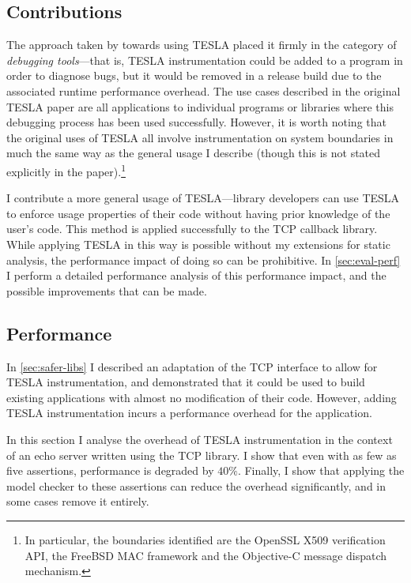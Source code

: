 \subsection{Contributions}

The approach taken by \textcite{anderson_tesla:_2014} towards using TESLA placed
it firmly in the category of \emph{debugging tools}---that is, TESLA
instrumentation could be added to a program in order to diagnose bugs, but it
would be removed in a release build due to the associated runtime performance
overhead. The use cases described in the original TESLA paper are all
applications to individual programs or libraries where this debugging process
has been used successfully. However, it is worth noting that the original uses
of TESLA all involve instrumentation on system boundaries in much the same way
as the general usage I describe (though this is not stated explicitly in the
paper).\footnote{In particular, the boundaries identified are the OpenSSL X509
verification API, the FreeBSD MAC framework and the Objective-C message dispatch
mechanism.}

I contribute a more general usage of TESLA---library developers can use TESLA to
enforce usage properties of their code without having prior knowledge of the
user's code. This method is applied successfully to the \lwip{} TCP callback
library. While applying TESLA in this way is possible without my extensions for
static analysis, the performance impact of doing so can be prohibitive. In
\autoref{sec:eval-perf} I perform a detailed performance analysis of this
performance impact, and the possible improvements that can be made.

\subsection{Performance} \label{sec:eval-perf}

In \autoref{sec:safer-libs} I described an adaptation of the \lwip{} TCP interface
to allow for TESLA instrumentation, and demonstrated that it could be used to
build existing applications with almost no modification of their code. However,
adding TESLA instrumentation incurs a performance overhead for the application.

In this section I analyse the overhead of TESLA instrumentation in the context
of an echo server written using the \lwip{} TCP library. I show that even with as
few as five assertions, performance is degraded by $40\%$. Finally, I show
that applying the model checker to these assertions can reduce the overhead
significantly, and in some cases remove it entirely.

